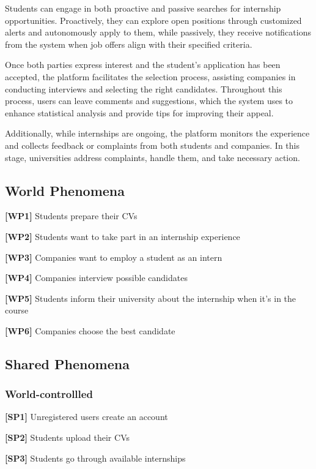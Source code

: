 Students can engage in both proactive and passive searches for internship opportunities. Proactively, they can explore open positions through customized alerts and autonomously apply to them, while passively, they receive notifications from the system when job offers align with their specified criteria.

Once both parties express interest and the student's application has been accepted, the platform facilitates the selection process, assisting companies in conducting interviews and selecting the right candidates. Throughout this process, users can leave comments and suggestions, which the system uses to enhance statistical analysis and provide tips for improving their appeal.

Additionally, while internships are ongoing, the platform monitors the experience and collects feedback or complaints from both students and companies. In this stage, universities address complaints, handle them, and take necessary action.

\subsection{World Phenomena}
\textbf{[WP1]} Students prepare their CVs

\textbf{[WP2]} Students want to take part in an internship experience 

\textbf{[WP3]} Companies want to employ a student as an intern 

\textbf{[WP4]} Companies interview possible candidates 

\textbf{[WP5]} Students inform their university about the internship when it's in the course

\textbf{[WP6]} Companies choose the best candidate

\pagebreak
\subsection{Shared Phenomena}

\subsubsection{World-controllled}

\textbf{[SP1]} Unregistered users create an account

\textbf{[SP2]} Students upload their CVs

\textbf{[SP3]} Students go through available internships


